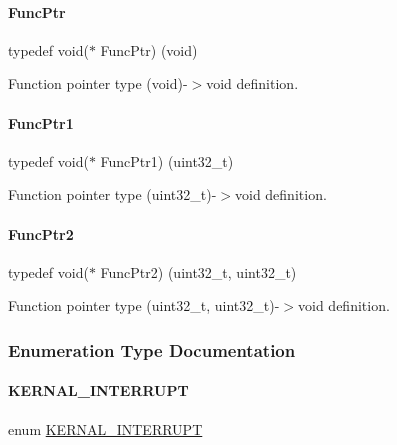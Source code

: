 \paragraph{\texorpdfstring{Func\+Ptr}{FuncPtr}}
{\footnotesize\ttfamily typedef void($\ast$ Func\+Ptr) (void)}

Function pointer type (void)-\/$>$void definition. \mbox{\label{a00020_a0891965816a5b721b07f7bebefaf7430}} 
\paragraph{\texorpdfstring{Func\+Ptr1}{FuncPtr1}}
{\footnotesize\ttfamily typedef void($\ast$ Func\+Ptr1) (uint32\+\_\+t)}

Function pointer type (uint32\+\_\+t)-\/$>$void definition. \mbox{\label{a00020_a331a88eeefe11112bb8fe1b43dd777b8}} 
\paragraph{\texorpdfstring{Func\+Ptr2}{FuncPtr2}}
{\footnotesize\ttfamily typedef void($\ast$ Func\+Ptr2) (uint32\+\_\+t, uint32\+\_\+t)}

Function pointer type (uint32\+\_\+t, uint32\+\_\+t)-\/$>$void definition. 

\subsubsection{Enumeration Type Documentation}
\mbox{\label{a00020_a4ecccde27f29cedbe9bc6a22e3aad16f}} 
\paragraph{\texorpdfstring{K\+E\+R\+N\+A\+L\+\_\+\+I\+N\+T\+E\+R\+R\+U\+PT}{KERNAL\_INTERRUPT}}
{\footnotesize\ttfamily enum \mbox{\hyperlink{a00020_a4ecccde27f29cedbe9bc6a22e3aad16f}{K\+E\+R\+N\+A\+L\+\_\+\+I\+N\+T\+E\+R\+R\+U\+PT}}}

